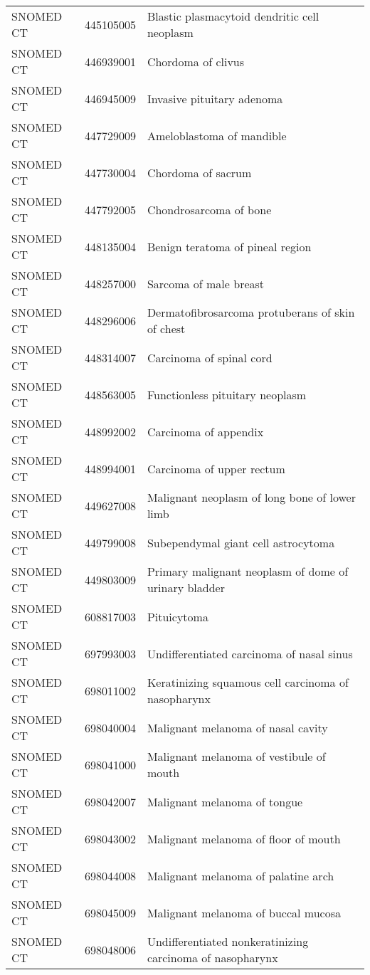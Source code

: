 \begin{longtable}{p{}p{}p{}}
  SNOMED CT & 445105005 & Blastic plasmacytoid dendritic cell neoplasm \\ 
  SNOMED CT & 446939001 & Chordoma of clivus \\ 
  SNOMED CT & 446945009 & Invasive pituitary adenoma \\ 
  SNOMED CT & 447729009 & Ameloblastoma of mandible \\ 
  SNOMED CT & 447730004 & Chordoma of sacrum \\ 
  SNOMED CT & 447792005 & Chondrosarcoma of bone \\ 
  SNOMED CT & 448135004 & Benign teratoma of pineal region \\ 
  SNOMED CT & 448257000 & Sarcoma of male breast \\ 
  SNOMED CT & 448296006 & Dermatofibrosarcoma protuberans of skin of chest \\ 
  SNOMED CT & 448314007 & Carcinoma of spinal cord \\ 
  SNOMED CT & 448563005 & Functionless pituitary neoplasm \\ 
  SNOMED CT & 448992002 & Carcinoma of appendix \\ 
  SNOMED CT & 448994001 & Carcinoma of upper rectum \\ 
  SNOMED CT & 449627008 & Malignant neoplasm of long bone of lower limb \\ 
  SNOMED CT & 449799008 & Subependymal giant cell astrocytoma \\ 
  SNOMED CT & 449803009 & Primary malignant neoplasm of dome of urinary bladder \\ 
  SNOMED CT & 608817003 & Pituicytoma \\ 
  SNOMED CT & 697993003 & Undifferentiated carcinoma of nasal sinus \\ 
  SNOMED CT & 698011002 & Keratinizing squamous cell carcinoma of nasopharynx \\ 
  SNOMED CT & 698040004 & Malignant melanoma of nasal cavity \\ 
  SNOMED CT & 698041000 & Malignant melanoma of vestibule of mouth \\ 
  SNOMED CT & 698042007 & Malignant melanoma of tongue \\ 
  SNOMED CT & 698043002 & Malignant melanoma of floor of mouth \\ 
  SNOMED CT & 698044008 & Malignant melanoma of palatine arch \\ 
  SNOMED CT & 698045009 & Malignant melanoma of buccal mucosa \\ 
  SNOMED CT & 698048006 & Undifferentiated nonkeratinizing carcinoma of nasopharynx \\ 

\end{longtable}

